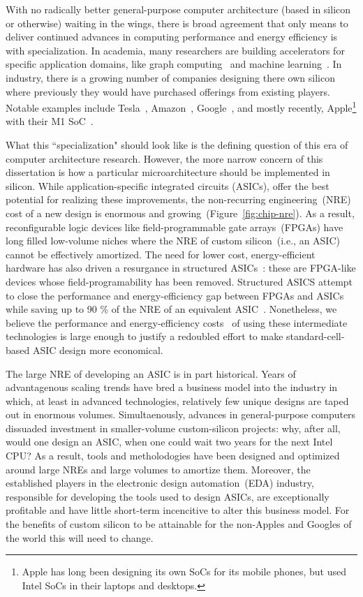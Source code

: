 With no radically better general-purpose computer architecture (based in
silicon or otherwise) waiting in the wings, there is broad agreement that only means to deliver continued advances in
computing performance and energy efficiency is with specialization. In
academia, many researchers are building accelerators
for specific application domains, like graph computing~\cite{Graphicionado}
and machine learning~\cite{Eyeriss}. In industry, there is a growing number of
companies designing there own silicon where previously they would have
purchased offerings from existing players. Notable
examples include Tesla~\cite{FSDChip}, Amazon~\cite{Graviton},
Google~\cite{TPU}, and mostly recently, Apple\footnote{Apple has long been
designing its own SoCs for its mobile phones, but used Intel SoCs in their laptops and desktops.} with their M1
SoC~\cite{AppleM1}.

What this ``specialization" should look like is the defining question
of this era of computer architecture research. However, the more narrow concern of
this dissertation is how a particular microarchitecture should be implemented in silicon.  While
application-specific integrated circuits (ASICs), offer the best potential for
realizing these improvements, the non-recurring engineering~(NRE) cost of a new
design is enormous and growing~(Figure~\ref{fig:chip-nre}). As a result, reconfigurable logic devices like
field-programmable gate arrays~(FPGAs) have long filled low-volume niches where
the NRE of custom silicon~(i.e., an ASIC) cannot be effectively amortized. The need for
lower cost, energy-efficient hardware has also driven a resurgance in
structured ASICs~\cite{SAHARA}: these are FPGA-like devices whose
field-programability has been removed. Structured ASICS attempt to close the performance and
energy-efficiency gap between FPGAs and ASICs while saving up to 90 \% of the
NRE of an equivalent ASIC~\cite{StructuredASIC}.  Nonetheless, we believe the
performance and energy-efficiency costs~\cite{FPGAGap2} of using these
intermediate technologies is large enough to justify a redoubled effort to make
standard-cell-based ASIC design more economical.

The large NRE of developing an ASIC is in part historical.  Years of
advantagenous scaling trends have bred a business model into the industry in
which, at least in advanced technologies, relatively few unique designs are
taped out in enormous volumes. Simultaenously, advances in general-purpose computers dissuaded
investment in smaller-volume custom-silicon projects: why, after all, would one
design an ASIC, when one could wait two years for the next Intel CPU?
As a result, tools and metholodogies have been designed and optimized around
large NREs and large volumes to amortize them. Moreover, the established
players in the electronic design automation~(EDA) industry, responsible for
developing the tools used to design ASICs, are exceptionally profitable and have little short-term
incencitive to alter this business model. For the benefits of custom silicon to be attainable for
the non-Apples and Googles of the world this will need to change.

